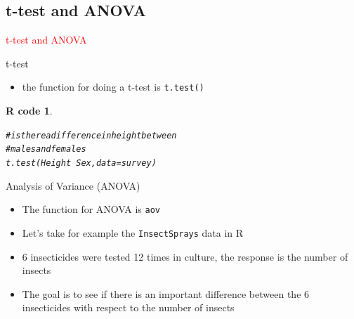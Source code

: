 \documentclass[11pt]{beamer}\usepackage[]{graphicx}\usepackage[]{color}
\makeatletter
\newcommand{\hlcom}[1]{\textcolor[rgb]{0.588,0.588,0.588}{#1}}%
\newcommand{\hlopt}[1]{\textcolor[rgb]{0.196,0.196,0.196}{#1}}%
\newcommand{\hlstd}[1]{\textcolor[rgb]{0.196,0.196,0.196}{#1}}%
\newcommand{\hlkwc}[1]{\textcolor[rgb]{0,0.631,0.314}{#1}}%
\newcommand{\hlkwd}[1]{\textcolor[rgb]{0.78,0.227,0.412}{#1}}%
\newenvironment{kframe}{%
 \def\at@end@of@kframe{}%
 \ifinner\ifhmode%
  \def\at@end@of@kframe{\end{minipage}}%
  \begin{minipage}{\columnwidth}%
 \fi\fi%
 \def\FrameCommand##1{\hskip\@totalleftmargin \hskip-\fboxsep
 \colorbox{shadecolor}{##1}\hskip-\fboxsep
     \hskip-\linewidth \hskip-\@totalleftmargin \hskip\columnwidth}%
 \MakeFramed {\advance\hsize-\width
   \@totalleftmargin\z@ \linewidth\hsize
   \@setminipage}}%
 {\par\unskip\endMakeFramed%
 \at@end@of@kframe}
\newenvironment{knitrout}{}{} %
\newtheorem{rcode}{R code}[section]
\newcommand{\code}[1]{\texttt{#1}}
\makeatother
\begin{document}
\subsection{t-test and ANOVA}

\begin{frame}
 \begin{center}
  \Huge{\textcolor{red}{t-test and ANOVA}}
 \end{center}
\end{frame}



\begin{frame}[fragile]{t-test}

\begin{itemize}
  \setlength\itemsep{1.5em}
  \item the function for doing a t-test is \code{t.test()}
\end{itemize}
\pause 
\begin{knitrout}
\color{fgcolor}\begin{kframe}
\begin{rcode}\label{unnamed-chunk-39}\begin{alltt}
\hlcom{# is there a difference in height between}
\hlcom{# males and females}
\hlkwd{t.test}\hlstd{(Height} \hlopt{~} \hlstd{Sex,} \hlkwc{data} \hlstd{= survey)}
\end{alltt}
\end{rcode}\end{kframe}
\end{knitrout}

\end{frame}







\begin{frame}[fragile]{Analysis of Variance (ANOVA)}

\begin{itemize}
  \setlength\itemsep{2em}
\item The function for ANOVA is \code{aov}
\pause \item Let's take for example the \code{InsectSprays} data in R
\pause \item 6 insecticides were tested 12 times in culture, the response is the number of insects
\pause \item The goal is to see if there is an important difference between the 6 insecticides with respect to the number of insects
\end{itemize}


\end{frame}
\end{document}
